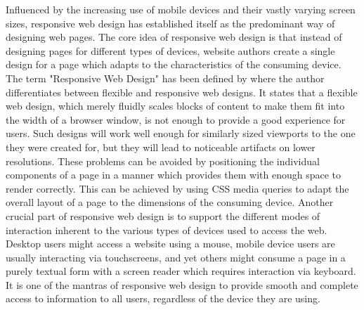 Influenced by the increasing use of mobile devices and their vastly varying screen sizes, responsive web design has established itself as the predominant way of designing web pages. 
The core idea of responsive web design is that instead of designing pages for different types of devices, website authors create a single design for a page which adapts to the characteristics of the consuming device. 
The term "Responsive Web Design" has been defined by \textcite{ResponsiveWebDesign} where the author differentiates between flexible and responsive web designs. 
It states that a flexible web design, which merely fluidly scales blocks of content to make them fit into the width of a browser window, is not enough to provide a good experience for users. 
Such designs will work well enough for similarly sized viewports to the one they were created for, but they will lead to noticeable artifacts on lower resolutions. 
These problems can be avoided by positioning the individual components of a page in a manner which provides them with enough space to render correctly.
This can be achieved by using CSS media queries to adapt the overall layout of a page to the dimensions of the consuming device. 
Another crucial part of responsive web design is to support the different modes of interaction inherent to the various types of devices used to access the web. 
Desktop users might access a website using a mouse, mobile device users are usually interacting via touchscreens, and yet others might consume a page in a purely textual form with a screen reader which requires interaction via keyboard. 
It is one of the mantras of responsive web design to provide smooth and complete access to information to all users, regardless of the device they are using. 
